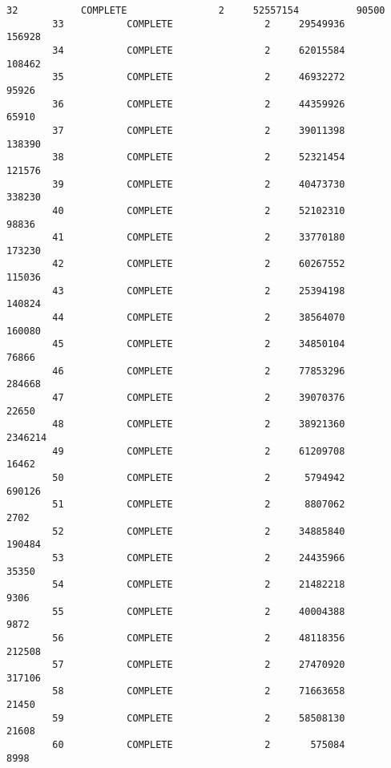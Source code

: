 \documentclass[11pt]{article}
\begin{document}
\begin{Verbatim}[commandchars=\\\{\}]
        32           COMPLETE                2     52557154          90500   
        33           COMPLETE                2     29549936         156928   
        34           COMPLETE                2     62015584         108462   
        35           COMPLETE                2     46932272          95926   
        36           COMPLETE                2     44359926          65910   
        37           COMPLETE                2     39011398         138390   
        38           COMPLETE                2     52321454         121576   
        39           COMPLETE                2     40473730         338230   
        40           COMPLETE                2     52102310          98836   
        41           COMPLETE                2     33770180         173230   
        42           COMPLETE                2     60267552         115036   
        43           COMPLETE                2     25394198         140824   
        44           COMPLETE                2     38564070         160080   
        45           COMPLETE                2     34850104          76866   
        46           COMPLETE                2     77853296         284668   
        47           COMPLETE                2     39070376          22650   
        48           COMPLETE                2     38921360        2346214   
        49           COMPLETE                2     61209708          16462   
        50           COMPLETE                2      5794942         690126   
        51           COMPLETE                2      8807062           2702   
        52           COMPLETE                2     34885840         190484   
        53           COMPLETE                2     24435966          35350   
        54           COMPLETE                2     21482218           9306   
        55           COMPLETE                2     40004388           9872   
        56           COMPLETE                2     48118356         212508   
        57           COMPLETE                2     27470920         317106   
        58           COMPLETE                2     71663658          21450   
        59           COMPLETE                2     58508130          21608   
        60           COMPLETE                2       575084           8998   
        

\end{Verbatim}
\end{document}
